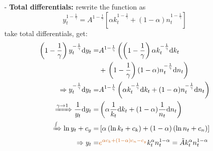 \documentclass[10pt,landscape,a4paper]{article}
\begin{document}
\begin{multicols*}{4}
\begin{itemize}
\begin{itemize}
        \item[-] \textbf{Total differentials:} rewrite the function as 
        $$
            y_t^{1-\frac{1}{\gamma}}=A^{1-\frac{1}{\gamma}}\left[\alpha k_t^{1-\frac{1}{\gamma}}+(1-\alpha)n_t^{1-\frac{1}{\gamma}}\right]
        $$
        take total differentials, get:
        \begin{align*}
            \left(1-\frac{1}{\gamma}\right)y_t^{-\frac{1}{\gamma}}\mathrm{d}y_t =& A^{1-\frac{1}{\gamma}}\left(\left(1-\frac{1}{\gamma}\right)\alpha k_t^{-\frac{1}{\gamma}}\mathrm{d}k_t\right.\\
            &+\left.\left(1-\frac{1}{\gamma}\right)(1-\alpha)n_t^{-\frac{1}{\gamma}}\mathrm{d}n_t\right)\\
            \Rightarrow y_t^{-\frac{1}{\gamma}}\mathrm{d}y_t =&A^{1-\frac{1}{\gamma}}\left(\alpha k_t^{-\frac{1}{\gamma}}\mathrm{d}k_t +(1-\alpha)n_t^{-\frac{1}{\gamma}}\mathrm{d}n_t\right)\\
            \xRightarrow{\gamma\rightarrow 1} \frac{1}{y_t}\mathrm{d}y_t=&\left(\alpha\frac{1}{k_t}\mathrm{d}k_t+(1-\alpha)\frac{1}{n_t}\mathrm{d}n_t \right)\\
            \xRightarrow{\int} \ln y_t +c_y =& \left[\alpha\left(\ln k_t+c_k\right)+(1-\alpha)\left( \ln n_t+c_n\right) \right]\\
            \Rightarrow y_t =& {\color{myorange}e^{\alpha c_k+(1-\alpha)c_n-c_y}}k_t^{\alpha}n_t^{1-\alpha}=\tilde{A}k_t^{\alpha}n_t^{1-\alpha}
        \end{align*}
        

\end{itemize}
\end{itemize}
\end{multicols*}
\end{document}

